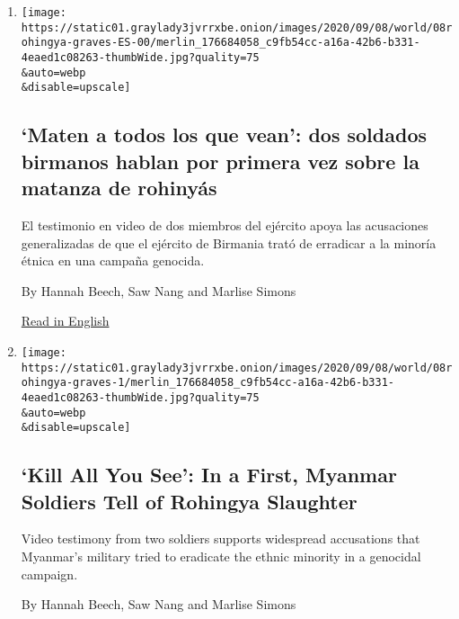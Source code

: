 \begin{enumerate}
\def\labelenumi{\arabic{enumi}.}
\item
  \href{/es/2020/09/08/espanol/mundo/rohinya-genocidio-birmania.html}{}

  \texttt{[image: https://static01.graylady3jvrrxbe.onion/images/2020/09/08/world/08rohingya-graves-ES-00/merlin\_176684058\_c9fb54cc-a16a-42b6-b331-4eaed1c08263-thumbWide.jpg?quality=75\\\&auto=webp\\\&disable=upscale]}

  \hypertarget{maten-a-todos-los-que-vean-dos-soldados-birmanos-hablan-por-primera-vez-sobre-la-matanza-de-rohinyuxe1s}{%
  \subsection{`Maten a todos los que vean': dos soldados birmanos hablan
  por primera vez sobre la matanza de
  rohinyás}\label{maten-a-todos-los-que-vean-dos-soldados-birmanos-hablan-por-primera-vez-sobre-la-matanza-de-rohinyuxe1s}}

  El testimonio en video de dos miembros del ejército apoya las
  acusaciones generalizadas de que el ejército de Birmania trató de
  erradicar a la minoría étnica en una campaña genocida.

  By Hannah Beech, Saw Nang and Marlise Simons

  \href{https://www.nytimes3xbfgragh.onion/2020/09/08/world/asia/myanmar-rohingya-genocide.html}{Read
  in English}
\item
  \href{/2020/09/08/world/asia/myanmar-rohingya-genocide.html}{}

  \texttt{[image: https://static01.graylady3jvrrxbe.onion/images/2020/09/08/world/08rohingya-graves-1/merlin\_176684058\_c9fb54cc-a16a-42b6-b331-4eaed1c08263-thumbWide.jpg?quality=75\\\&auto=webp\\\&disable=upscale]}

  \hypertarget{kill-all-you-see-in-a-first-myanmar-soldiers-tell-of-rohingya-slaughter}{%
  \subsection{`Kill All You See': In a First, Myanmar Soldiers Tell of
  Rohingya
  Slaughter}\label{kill-all-you-see-in-a-first-myanmar-soldiers-tell-of-rohingya-slaughter}}

  Video testimony from two soldiers supports widespread accusations that
  Myanmar's military tried to eradicate the ethnic minority in a
  genocidal campaign.

  By Hannah Beech, Saw Nang and Marlise Simons


\end{enumerate}
